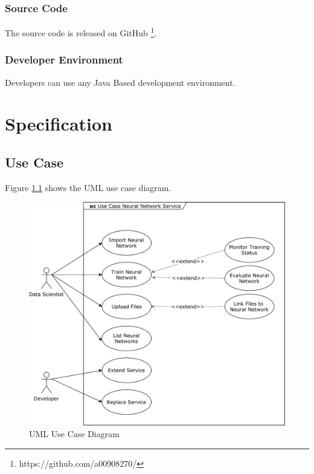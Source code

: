 \subsection{Source Code}\label{source-code}

The source code is released on GitHub \footnote{https://github.com/a00908270/}.

\subsection{Developer Environment}\label{developer-environment}

Developers can use any Java Based development environment.

\chapter{Specification}\label{specification}

\section{Use Case}\label{use-case}

Figure \ref{img.use_case_nn} shows the UML use case diagram.

\begin{figure}
\centering
\includegraphics[width=15.00000cm]{images/use_case_nn}
\caption{UML Use Case Diagram \label{img.use_case_nn}}
\end{figure}

